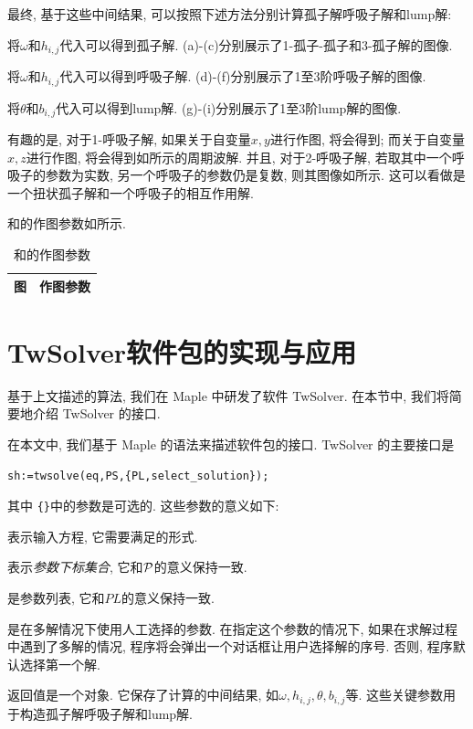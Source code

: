 最终, 基于这些中间结果, 可以按照下述方法分别计算孤子解\D 呼吸子解和lump解:
\begin{compactitem}[\textbullet]
\item 将$\omega$和$h_{i,j}$代入可以得到孤子解. (a)-(c)分别展示了1-孤子-孤子和3-孤子解的图像. 
\item 将$\omega$和$h_{i,j}$代入可以得到呼吸子解. (d)-(f)分别展示了1至3阶呼吸子解的图像.
\item 将$\theta$和$b_{i,j}$代入可以得到lump解. (g)-(i)分别展示了1至3阶lump解的图像.  
\end{compactitem}

有趣的是, 对于1-呼吸子解, 如果关于自变量$x,y$进行作图, 将会得到; 而关于自变量$x,z$进行作图, 将会得到如所示的周期波解. 并且, 对于2-呼吸子解, 若取其中一个呼吸子的参数为实数, 另一个呼吸子的参数仍是复数, 则其图像如所示. 这可以看做是一个扭状孤子解和一个呼吸子的相互作用解. 

和的作图参数如所示.

\begin{table}[htbp]
\centering 
\caption{和的作图参数\label{jm-plist}}
\small
\renewcommand{\arraystretch}{1.1}
\begin{tabular}{cp{}}
\hline 
\multicolumn{1}{c}{图} & \multicolumn{1}{c}{作图参数} \\ 
\hline 

\hline
\end{tabular}
\end{table}

\section{TwSolver软件包的实现与应用}
基于上文描述的算法, 我们在 Maple 中研发了软件 TwSolver. 在本节中, 我们将简要地介绍 TwSolver 的接口. 

在本文中, 我们基于 Maple 的语法来描述软件包的接口. TwSolver 的主要接口是 
\begin{verbatim}
sh:=twsolve(eq,PS,{PL,select_solution});
\end{verbatim}
其中 \verb|{}|中的参数是可选的. 这些参数的意义如下: 
\begin{compactitem}[\textbullet]
\item {}表示输入方程, 它需要满足的形式.
\item {}表示\emph{参数下标集合}, 它和$\mathcal{P}$的意义保持一致. 
\item {}是参数列表, 它和$PL$的意义保持一致.
\item {}是在多解情况下使用人工选择的参数. 在指定这个参数的情况下, 如果在求解过程中遇到了多解的情况, 程序将会弹出一个对话框让用户选择解的序号. 否则, 程序默认选择第一个解.
\item 返回值是一个对象. 它保存了计算的中间结果, 如$\omega,h_{i,j},\theta,b_{i,j}$等. 这些关键参数用于构造孤子解\D 呼吸子解和lump解. 
\end{compactitem}
    
